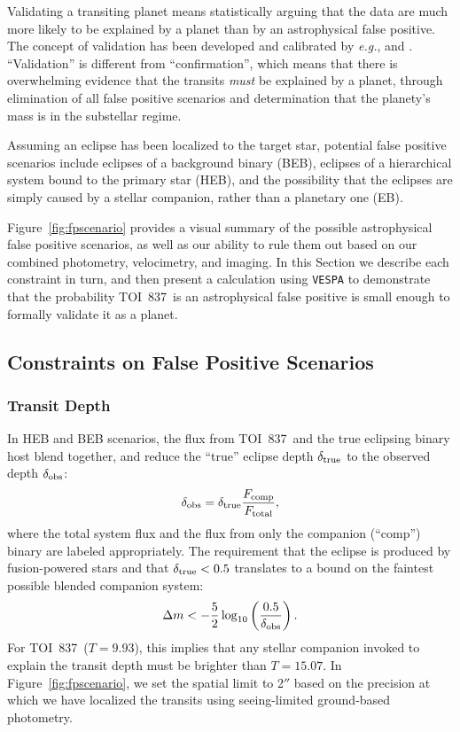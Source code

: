 \documentclass[12pt,twocolumn,tighten]{aastex63}
\newcommand{\tn}{TOI~837} %
\begin{document}
Validating a transiting planet means statistically arguing that the
data are much more likely to be explained by a planet than by an
astrophysical false positive. The concept of validation has been
developed and calibrated by {\it e.g.},
\citet{torres_modeling_2011,morton_efficient_2012,diaz_pastis_2014,santerne_pastis_2015,morton_false_2016}
and \citet{giacalone_triceratops_2020}.  ``Validation'' is different
from ``confirmation'', which means that there is overwhelming evidence
that the transits {\it must} be explained by a planet, through
elimination of all false positive scenarios and determination that the
planety's mass is in the substellar regime.

Assuming an eclipse has been localized to the target star, potential
false positive scenarios include eclipses of a background binary
(BEB), eclipses of a hierarchical system bound to the primary star
(HEB), and the possibility that the eclipses are simply caused by a
stellar companion, rather than a planetary one (EB).

Figure~\ref{fig:fpscenario} provides a visual summary of the possible
astrophysical false positive scenarios, as well as our ability to rule
them out based on our combined photometry, velocimetry, and imaging.
In this Section we describe each constraint in turn, and then present
a calculation using \texttt{VESPA} \citep{morton_efficient_2012} to
demonstrate that the probability \tn\ is an astrophysical false
positive is small enough to formally validate it as a planet.



\subsection{Constraints on False Positive Scenarios}
\label{subsec:fp_constraints}

\subsubsection{Transit Depth}
In HEB and BEB scenarios, the flux from \tn\ and the true eclipsing
binary host blend together, and reduce the ``true'' eclipse depth
$\delta_{\rm true}$ to the observed depth
$\delta_{\rm obs}$:
\begin{equation}
  \delta_{\rm obs}
  = 
  \delta_{\rm true} \frac{F_{\rm comp}}{F_{\rm total}},
\end{equation}
where the total system flux and the flux from only the companion
(``comp'') binary are labeled appropriately.  The requirement that the
eclipse is produced by fusion-powered stars and that $\delta_{\rm true} < 0.5$
translates to a bound on the faintest possible blended companion
system:
\begin{equation}
  \Delta m < -\frac{5}{2} \log_{10}
             \left( \frac{0.5}{\delta_{\rm obs}} \right).
\end{equation}
For \tn\ ($T=9.93$), this implies that any stellar companion invoked
to explain the transit depth must be brighter than $T=15.07$.  In
Figure~\ref{fig:fpscenario}, we set the spatial limit to 2$''$ based
on the precision at which we have localized the transits using
seeing-limited ground-based photometry.
\end{document}
